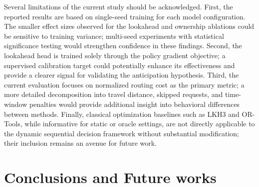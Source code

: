 \documentclass[conference]{IEEEtran}
\begin{document}
Several limitations of the current study should be acknowledged. First, the reported results are based on single-seed training for each model configuration. The smaller effect sizes observed for the lookahead and ownership ablations could be sensitive to training variance; multi-seed experiments with statistical significance testing would strengthen confidence in these findings. Second, the lookahead head is trained solely through the policy gradient objective; a supervised calibration target could potentially enhance its effectiveness and provide a clearer signal for validating the anticipation hypothesis. Third, the current evaluation focuses on normalized routing cost as the primary metric; a more detailed decomposition into travel distance, skipped requests, and time-window penalties would provide additional insight into behavioral differences between methods. Finally, classical optimization baselines such as LKH3 and OR-Tools, while informative for static or oracle settings, are not directly applicable to the dynamic sequential decision framework without substantial modification; their inclusion remains an avenue for future work.

\section{Conclusions and Future works} \label{sec:futurework}


\end{document}

